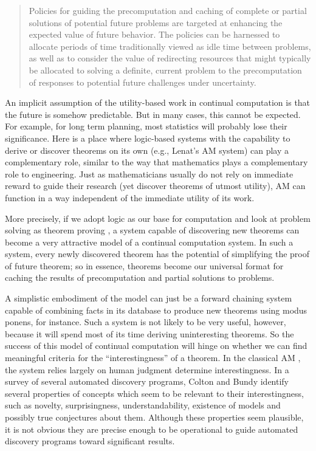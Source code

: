 \documentclass[]{llncs}
\begin{document}
\begin{quotation}
  Policies for guiding the precomputation and caching of complete or
  partial solutions of potential future problems are targeted at enhancing
  the expected value of future behavior.  The policies can be harnessed to
  allocate periods of time traditionally viewed as idle time between
  problems, as well as to consider the value of redirecting resources that
  might typically be allocated to solving a definite, current problem to
  the precomputation of responses to potential future challenges under
  uncertainty\cite{horvitz2001:principles}.
\end{quotation}
An implicit assumption of the utility-based work in continual computation
is that the future is somehow predictable.  But in many cases, this cannot
be expected.  For example, for long term planning, most statistics will
probably lose their significance.  Here is a place where logic-based
systems with the capability to derive or discover theorems on its own
(e.g., Lenat's AM system) can play a complementary role, similar to the way
that mathematics plays a complementary role to engineering.  Just as
mathematicians usually do not rely on immediate reward to guide their
research (yet discover theorems of utmost utility), AM can function in a
way independent of the immediate utility of its work.

More precisely, if we adopt logic as our base for computation and look at
problem solving as theorem proving \cite{bibel1997:let_plan}, a system
capable of discovering new theorems can become a very attractive model of a
continual computation system.  In such a system, every newly discovered
theorem has the potential of simplifying the proof of future theorem; so in
essence, theorems become our universal format for caching the results of
precomputation and partial solutions to problems.

A simplistic embodiment of the model can just be a forward chaining system
capable of combining facts in its database to produce new theorems using
modus ponens, for instance.  Such a system is not likely to be very useful,
however, because it will spend most of its time deriving uninteresting
theorems.  So the success of this model of continual computation will hinge
on whether we can find meaningful criteria for the {}``interestingness'' of
a theorem.  In the classical AM
\cite{lenat1982:am,lenat1983:theory_formation,lenat/brown1984:why_am}, the
system relies largely on human judgment determine interestingness.  In a
survey of several automated discovery programs, Colton and Bundy
\cite{colton/bundy1999:notion_interestingness} identify several properties
of concepts which seem to be relevant to their interestingness, such as
novelty, surprisingness, understandability, existence of models and
possibly true conjectures about them.  Although these properties seem
plausible, it is not obvious they are precise enough to be operational to
guide automated discovery programs toward significant results.
\end{document}
